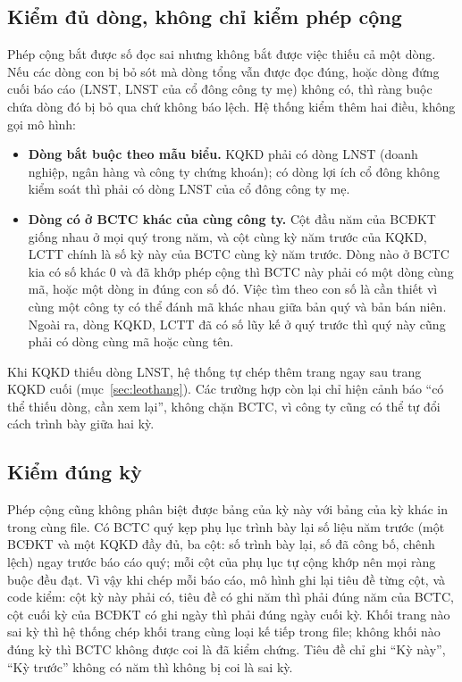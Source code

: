 \documentclass[12pt,a4paper]{report}
\newcommand{\enquote}[1]{“#1”}
\begin{document}
\subsection{Kiểm đủ dòng, không chỉ kiểm phép cộng}\label{sec:duydong}
Phép cộng bắt được số đọc sai nhưng không bắt được việc thiếu cả một dòng. Nếu các dòng con bị bỏ sót mà dòng tổng vẫn
được đọc đúng, hoặc dòng đứng cuối báo cáo (LNST, LNST của cổ đông công ty mẹ) không có, thì ràng buộc chứa dòng đó bị bỏ
qua chứ không báo lệch. Hệ thống kiểm thêm hai điều, không gọi mô hình:
\begin{itemize}
  \item \textbf{Dòng bắt buộc theo mẫu biểu.} KQKD phải có dòng LNST (doanh nghiệp, ngân hàng và công ty chứng khoán);
        có dòng lợi ích cổ đông không kiểm soát thì phải có dòng LNST của cổ đông công ty mẹ.
  \item \textbf{Dòng có ở BCTC khác của cùng công ty.} Cột đầu năm của BCĐKT giống nhau ở mọi quý trong năm, và cột cùng kỳ
        năm trước của KQKD, LCTT chính là số kỳ này của BCTC cùng kỳ năm trước. Dòng nào ở BCTC kia có số khác 0 và đã
        khớp phép cộng thì BCTC này phải có một dòng cùng mã, hoặc một dòng in đúng con số đó. Việc tìm theo con số là cần
        thiết vì cùng một công ty có thể đánh mã khác nhau giữa bản quý và bản bán niên. Ngoài ra, dòng KQKD, LCTT đã có
        số lũy kế ở quý trước thì quý này cũng phải có dòng cùng mã hoặc cùng tên.
\end{itemize}
Khi KQKD thiếu dòng LNST, hệ thống tự chép thêm trang ngay sau trang KQKD cuối (mục~\ref{sec:leothang}). Các trường hợp
còn lại chỉ hiện cảnh báo \enquote{có thể thiếu dòng, cần xem lại}, không chặn BCTC, vì công ty cũng có thể tự đổi cách
trình bày giữa hai kỳ.

\subsection{Kiểm đúng kỳ}\label{sec:dungky}
Phép cộng cũng không phân biệt được bảng của kỳ này với bảng của kỳ khác in trong cùng file. Có BCTC quý kẹp phụ lục trình
bày lại số liệu năm trước (một BCĐKT và một KQKD đầy đủ, ba cột: số trình bày lại, số đã công bố, chênh lệch) ngay trước
báo cáo quý; mỗi cột của phụ lục tự cộng khớp nên mọi ràng buộc đều đạt. Vì vậy khi chép mỗi báo cáo, mô hình ghi lại tiêu
đề từng cột, và code kiểm: cột kỳ này phải có, tiêu đề có ghi năm thì phải đúng năm của BCTC, cột cuối kỳ của BCĐKT có ghi
ngày thì phải đúng ngày cuối kỳ. Khối trang nào sai kỳ thì hệ thống chép khối trang cùng loại kế tiếp trong file; không khối
nào đúng kỳ thì BCTC không được coi là đã kiểm chứng. Tiêu đề chỉ ghi \enquote{Kỳ này}, \enquote{Kỳ trước} không có năm thì
không bị coi là sai kỳ.
\end{document}
